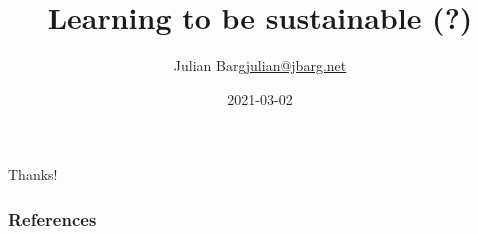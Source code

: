 \documentclass[notes=none]{beamer}
\title{Learning to be sustainable (?)}
\author{\texorpdfstring{Julian Barg\newline\url{julian@jbarg.net}}{Author}
	}
\institute{Ivey Business School}
\date{2021-03-02}
\begin{document}

	

	

	

	

	\begin{frame}
		\huge Thanks!
	\end{frame}

	\begin{frame}
		\frametitle{References}
		\printbibliography
	\end{frame}
\end{document}
